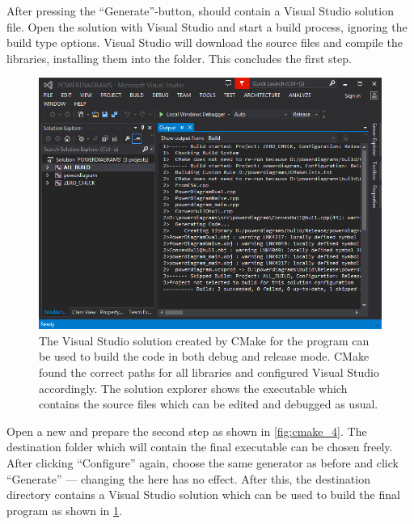After pressing the \enquote{Generate}-button,  should contain a Visual Studio solution file.
Open the solution with Visual Studio and start a build process, ignoring the build type options.
Visual Studio will download the source files and compile the libraries, installing them into the  folder.
This concludes the first step.

\begin{figure}[tb]
    \centering
    \includegraphics[width=0.9\linewidth]{cmake_5.png}
    \caption{The Visual Studio solution created by CMake for the program can be used to build the code in both debug and release mode.
    CMake found the correct paths for all libraries and configured Visual Studio accordingly.
    The solution explorer shows the  executable which contains the source files which can be edited and debugged as usual.}
    \label{fig:cmake_5}
\end{figure}
Open a new  and prepare the second step as shown in \cref{fig:cmake_4}.
The destination folder which will contain the final executable can be chosen freely.
After clicking \enquote{Configure} again, choose the same generator as before and click \enquote{Generate} --- changing the  here has no effect.
After this, the destination directory contains a Visual Studio solution which can be used to build the final program as shown in \cref{fig:cmake_5}.

